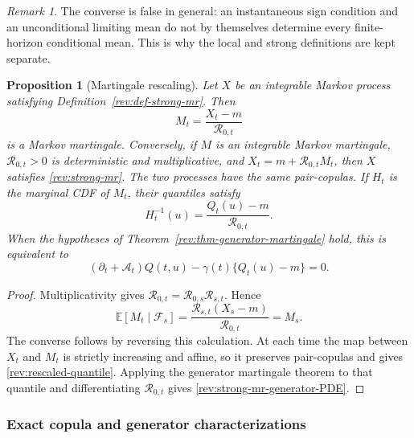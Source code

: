 \documentclass[11pt]{article}
\newtheorem{proposition}[definition]{Proposition}
\theoremstyle{remark}
\newtheorem{remark}[definition]{Remark}
\newcommand{\E}{\mathbb E}
\begin{document}
\begin{remark}
The converse is false in general: an instantaneous sign condition and an
unconditional limiting mean do not by themselves determine every finite-horizon
conditional mean.  This is why the local and strong definitions are kept
separate.
\end{remark}

\begin{proposition}[Martingale rescaling]
\label{rev:prop-martingale-rescaling}
Let $X$ be an integrable Markov process satisfying
Definition~\ref{rev:def-strong-mr}.  Then
\begin{equation}
M_t=\frac{X_t-m}{\mathcal R_{0,t}}
\label{rev:martingale-rescaling}
\end{equation}
is a Markov martingale.  Conversely, if $M$ is an integrable Markov martingale,
$\mathcal R_{0,t}>0$ is deterministic and multiplicative, and
$X_t=m+\mathcal R_{0,t}M_t$, then $X$ satisfies
\eqref{rev:strong-mr}.  The two processes have the same pair-copulas.  If
$H_t$ is the marginal CDF of $M_t$, their quantiles satisfy
\begin{equation}
H_t^{-1}(u)=\frac{Q_t(u)-m}{\mathcal R_{0,t}}.
\label{rev:rescaled-quantile}
\end{equation}
When the hypotheses of Theorem~\ref{rev:thm-generator-martingale} hold, this is
equivalent to
\begin{equation}
(\partial_t+\mathcal A_t)Q(t,u)
-\gamma(t)\{Q_t(u)-m\}=0.
\label{rev:strong-mr-generator-PDE}
\end{equation}
\end{proposition}

\begin{proof}
Multiplicativity gives
$\mathcal R_{0,t}=\mathcal R_{0,s}\mathcal R_{s,t}$.  Hence
\[
\E[M_t\mid\mathcal F_s]
=\frac{\mathcal R_{s,t}(X_s-m)}{\mathcal R_{0,t}}
=M_s.
\]
The converse follows by reversing this calculation.  At each time the map
between $X_t$ and $M_t$ is strictly increasing and affine, so it preserves
pair-copulas and gives \eqref{rev:rescaled-quantile}.  Applying the generator
martingale theorem to that quantile and differentiating
$\mathcal R_{0,t}$ gives \eqref{rev:strong-mr-generator-PDE}.
\end{proof}

\subsubsection{Exact copula and generator characterizations}
\end{document}
